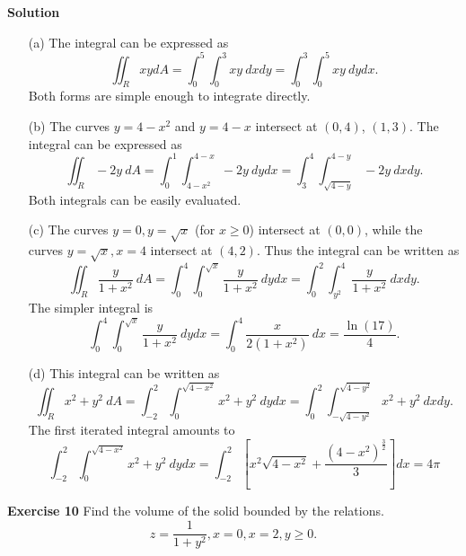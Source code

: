 \documentclass[12pt,oneside]{exam}
\newenvironment{exercise}[1]{\vspace{.1in}\noindent\textbf{Exercise #1 \hspace{.05em}}}{}
\newenvironment{newsolution}{\vspace{.1in}\noindent\textbf{Solution \hspace{.05em}}}{}
\begin{document}
\begin{newsolution}
\begin{itemize}
\item[(a)] The integral can be expressed as
\begin{equation*}
\iint_{R} xy dA  = \int_{0}^{5} \int_{0}^{3} xy \ dx dy = \int_{0}^{3} \int_{0}^{5} xy \ dy dx. 
\end{equation*}
Both forms are simple enough to integrate directly. 
\item[(b)] The curves $y=4-x^2$ and $y=4-x$ intersect at $(0,4)$, $(1,3)$. The integral can be expressed as
\begin{equation*}
\iint_{R} -2y\  dA = \int_{0}^{1} \int_{4-x^2}^{4-x} -2y  \ dy dx = \int_{3}^{4} \int_{\sqrt{4-y}}^{4-y} -2y \ dx dy.
\end{equation*}
Both integrals can be easily evaluated. 
\item[(c)] The curves $y=0, y=\sqrt{x}$ (for $x \geq 0$) intersect at $(0,0)$, while the curves $y=\sqrt{x}, x=4$ intersect at $(4,2)$. Thus the integral can be written as 
\begin{equation*}
\iint_{R} \frac{y}{1+x^2}\  dA = \int_{0}^{4} \int_{0}^{\sqrt{x}}  \frac{y}{1+x^2} \ dy dx = \int_{0}^{2} \int_{y^2}^{4}  \frac{y}{1+x^2} \ dx dy.
\end{equation*}
The simpler integral is 
\begin{equation*}
\int_{0}^{4} \int_{0}^{\sqrt{x}}  \frac{y}{1+x^2} \ dy dx  = \int_{0}^{4} \frac{x}{2(1+x^2)} \ dx = \frac{\ln(17)}{4}.
\end{equation*}
\item[(d)] This integral can be written as 
\begin{equation*}
\iint_{R} x^2+y^2 \ dA = \int_{-2}^{2} \int_{0}^{\sqrt{4-x^2}} x^2+y^2 \ dy dx = \int_{0}^{2} \int_{-\sqrt{4-y^2}}^{\sqrt{4-y^2}} x^2+ y^2 \ dx dy.
\end{equation*}
The first iterated integral amounts to 
\begin{equation*}
\int_{-2}^{2} \int_{0}^{\sqrt{4-x^2}} x^2+y^2 \ dy dx = \int_{-2}^{2} \left[ x^2\sqrt{4-x^2} + \frac{(4-x^2)^{\frac{3}{2}}}{3}\right] dx = 4\pi
\end{equation*}
\end{itemize}
\end{newsolution}

\begin{exercise}{10}
Find the volume of the solid bounded by the relations. 
\begin{equation*}
z=\frac{1}{1+y^2}, x=0, x=2, y \geq 0.
\end{equation*}
\end{exercise}
\end{document}
